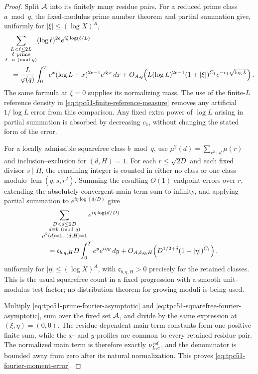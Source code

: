 \begin{proof}
Split \(\mathcal A\) into its finitely many residue pairs.  For a reduced
prime class \(a\bmod q\), the fixed-modulus prime number theorem and
partial summation give, uniformly for
\(|\xi|\leq(\log X)^A\),
\begin{align}
 &\sum_{\substack{L<\ell\leq2L\\
                   \ell\ {\rm prime}\\
                   \ell\equiv a\pmod q}}
 (\log\ell)^{2e}e^{i\xi\log(\ell/L)}
 \notag\\
 &\quad=
 \frac{L}{\varphi(q)}
 \int_0^T e^x(\log L+x)^{2e-1}e^{i\xi x}\,dx
 +O_{A,q}\!\left(
 L(\log L)^{2e-1}(1+|\xi|)^{C_1}
 e^{-c_1\sqrt{\log L}}\right).
 \label{eq:tpc51-prime-fourier-asymptotic}
\end{align}
The same formula at \(\xi=0\) supplies its normalizing mass.  The use
of the finite-\(L\) reference density in
\eqref{eq:tpc51-finite-reference-measure} removes any artificial
\(1/\log L\) error from this comparison.  Any fixed extra power of
\(\log L\) arising in partial summation is absorbed by decreasing
\(c_1\), without changing the stated form of the error.

For a locally admissible squarefree class \(b\bmod q\), use
\(\mu^2(d)=\sum_{r^2\mid d}\mu(r)\) and inclusion--exclusion for
\((d,H)=1\).  For each \(r\leq\sqrt{2D}\) and each fixed divisor
\(s\mid H\), the remaining integer is counted in either no class or one
class modulo \(\operatorname{lcm}(q,s,r^2)\).  Summing the resulting
\(O(1)\) endpoint errors over \(r\), extending the absolutely
convergent main-term sum to infinity, and applying partial summation to
\(e^{i\eta\log(d/D)}\) give
\begin{align}
 &\sum_{\substack{D<d\leq2D\\d\equiv b\pmod q\\
       \mu^2(d)=1,\ (d,H)=1}}
 e^{i\eta\log(d/D)}
 \notag\\
 &\quad=
 \mathfrak c_{b,q,H}D
 \int_0^T e^y e^{i\eta y}\,dy
 +O_{A,\delta,q,H}\!\left(
 D^{1/2+\delta}(1+|\eta|)^{C_1}\right),
 \label{eq:tpc51-squarefree-fourier-asymptotic}
\end{align}
uniformly for \(|\eta|\leq(\log X)^A\), with
\(\mathfrak c_{b,q,H}>0\) precisely for the retained classes.  This is
the usual squarefree count in a fixed progression with a smooth
unit-modulus test factor; no distribution theorem for growing moduli is
being used.

Multiply \eqref{eq:tpc51-prime-fourier-asymptotic} and
\eqref{eq:tpc51-squarefree-fourier-asymptotic}, sum over the fixed set
\(\mathcal A\), and divide by the same expression at
\((\xi,\eta)=(0,0)\).  The residue-dependent main-term constants form
one positive finite sum, while the \(x\)- and \(y\)-profiles are common
to every retained residue pair.  The normalized main term is therefore
exactly \(\nu_{L,e}^{\rm ref}\), and the denominator is bounded away
from zero after its natural normalization.  This proves
\eqref{eq:tpc51-fourier-moment-error}.


\end{proof}
